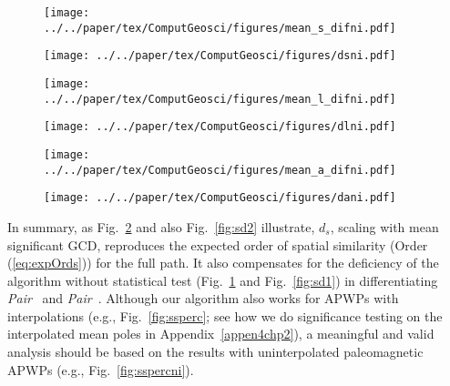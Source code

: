 \begin{figure*}[!ht]
  \captionsetup[subfigure]{singlelinecheck=off,justification=raggedright,aboveskip=-6pt,belowskip=-6pt}
  \centering
  \begin{subfigure}[htbp]{.495\textwidth}
    \centering
    \caption{}\label{fig:sd1ni}
    \texttt{[image: ../../paper/tex/ComputGeosci/figures/mean\_s\_difni.pdf]}
  \end{subfigure}
  \vspace{.5em}
  \begin{subfigure}[htbp]{.495\textwidth}
    \centering
    \caption{}\label{fig:sd2ni}
    \texttt{[image: ../../paper/tex/ComputGeosci/figures/dsni.pdf]}
  \end{subfigure}
  \begin{subfigure}[htbp]{.495\textwidth}
    \centering
    \caption{}\label{fig:ld1ni}
    \texttt{[image: ../../paper/tex/ComputGeosci/figures/mean\_l\_difni.pdf]}
  \end{subfigure}
  \vspace{.5em}
  \begin{subfigure}[htbp]{.495\textwidth}
    \centering
    \caption{}\label{fig:ld2ni}
    \texttt{[image: ../../paper/tex/ComputGeosci/figures/dlni.pdf]}
  \end{subfigure}
  \begin{subfigure}[htbp]{.495\textwidth}
    \centering
    \caption{}\label{fig:ad1ni}
    \texttt{[image: ../../paper/tex/ComputGeosci/figures/mean\_a\_difni.pdf]}
  \end{subfigure}
  \begin{subfigure}[htbp]{.495\textwidth}
    \centering
    \caption{}\label{fig:ad2ni}
    \texttt{[image: ../../paper/tex/ComputGeosci/figures/dani.pdf]}
  \end{subfigure}
\caption[Spatial, length, angular differences and significant differences of
seven exaple APWP pairs (without interpolations)]{Spatial, length and angular
differences between two paths of the seven APWP pairs with no interpolated poles
shown in Fig.~\ref{fig:2traj}. Left column: results without significance testing
imposed in the metric; Right column: results with significance testing. See
explanation of Fig.~\ref{fig:ssperc}.}\label{fig:sspercni}
\end{figure*}

In summary, as Fig.~\ref{fig:sd2ni} and also Fig.~\ref{fig:sd2} illustrate,
$d_s$, scaling with mean significant GCD, reproduces the expected order of
spatial similarity (Order (\ref{eq:expOrds})) for the full path. It also
compensates for the deficiency of the algorithm without statistical test
(Fig.~\ref{fig:sd1ni} and Fig.~\ref{fig:sd1}) in differentiating
\emph{Pair}~\textbf{} and
\emph{Pair}~\textbf{}. Although our algorithm also works for
APWPs with interpolations (e.g., Fig.~\ref{fig:ssperc}; see how we do
significance testing on the interpolated mean poles in
Appendix~\ref{appen4chp2}), a meaningful and valid analysis should be based on
the results with uninterpolated paleomagnetic APWPs (e.g.,
Fig.~\ref{fig:sspercni}).

